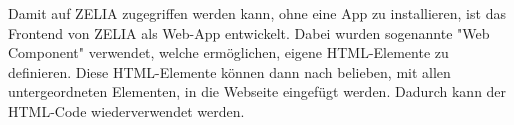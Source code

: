 
Damit auf ZELIA zugegriffen werden kann, ohne eine App zu installieren, ist das Frontend von ZELIA als Web-App entwickelt. Dabei wurden sogenannte "Web Component" verwendet, welche ermöglichen, eigene HTML-Elemente zu definieren. Diese HTML-Elemente können dann nach belieben, mit allen untergeordneten Elementen, in die Webseite eingefügt werden. Dadurch kann der HTML-Code wiederverwendet werden.


\pagebreak
